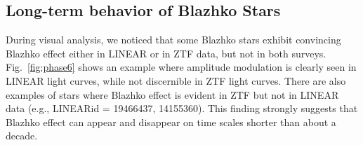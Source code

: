 \subsection{Long-term behavior of Blazhko Stars}



During visual analysis, we noticed that some Blazhko stars exhibit
convincing Blazhko effect either in LINEAR or in ZTF data, but not in
both surveys. Fig.~\ref{fig:phase6} shows an example where amplitude
modulation is clearly seen in LINEAR light curves, while not discernible
in ZTF light curves.  There are also examples of stars where Blazhko effect is evident in
ZTF but not in LINEAR data (e.g., LINEARid = 19466437, 14155360). 
This finding  strongly suggests that Blazhko effect can appear and disappear on time scales shorter than
about a decade.

 